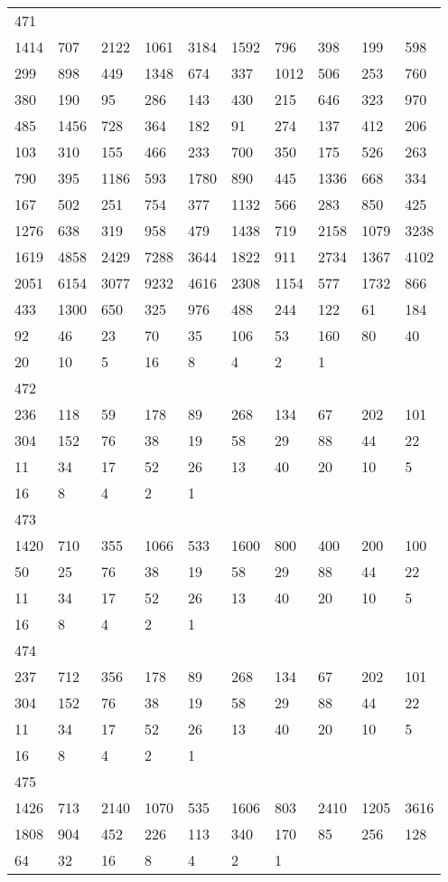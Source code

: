 \begin{longtable}{*{10}{l}}
471&&&&&&&&&\\
1414& 707& 2122& 1061& 3184& 1592& 796& 398& 199& 598\\
299& 898& 449& 1348& 674& 337& 1012& 506& 253& 760\\
380& 190& 95& 286& 143& 430& 215& 646& 323& 970\\
485& 1456& 728& 364& 182& 91& 274& 137& 412& 206\\
103& 310& 155& 466& 233& 700& 350& 175& 526& 263\\
790& 395& 1186& 593& 1780& 890& 445& 1336& 668& 334\\
167& 502& 251& 754& 377& 1132& 566& 283& 850& 425\\
1276& 638& 319& 958& 479& 1438& 719& 2158& 1079& 3238\\
1619& 4858& 2429& 7288& 3644& 1822& 911& 2734& 1367& 4102\\
2051& 6154& 3077& 9232& 4616& 2308& 1154& 577& 1732& 866\\
433& 1300& 650& 325& 976& 488& 244& 122& 61& 184\\
92& 46& 23& 70& 35& 106& 53& 160& 80& 40\\
20& 10& 5& 16& 8& 4& 2& 1& \\

472&&&&&&&&&\\
236& 118& 59& 178& 89& 268& 134& 67& 202& 101\\
304& 152& 76& 38& 19& 58& 29& 88& 44& 22\\
11& 34& 17& 52& 26& 13& 40& 20& 10& 5\\
16& 8& 4& 2& 1& \\

473&&&&&&&&&\\
1420& 710& 355& 1066& 533& 1600& 800& 400& 200& 100\\
50& 25& 76& 38& 19& 58& 29& 88& 44& 22\\
11& 34& 17& 52& 26& 13& 40& 20& 10& 5\\
16& 8& 4& 2& 1& \\

474&&&&&&&&&\\
237& 712& 356& 178& 89& 268& 134& 67& 202& 101\\
304& 152& 76& 38& 19& 58& 29& 88& 44& 22\\
11& 34& 17& 52& 26& 13& 40& 20& 10& 5\\
16& 8& 4& 2& 1& \\

475&&&&&&&&&\\
1426& 713& 2140& 1070& 535& 1606& 803& 2410& 1205& 3616\\
1808& 904& 452& 226& 113& 340& 170& 85& 256& 128\\
64& 32& 16& 8& 4& 2& 1& \\


\end{longtable}
